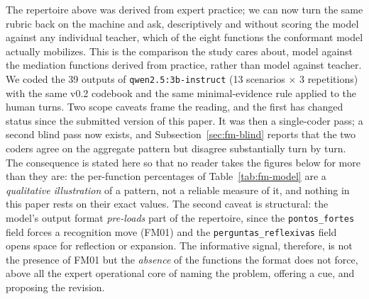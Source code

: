 \documentclass{sbc2023}%
\begin{document}
The repertoire above was derived from expert practice; we can now turn the same rubric back on the machine and ask, descriptively and without scoring the model against any individual teacher, which of the eight functions the conformant model actually mobilizes. This is the comparison the study cares about, model against the mediation functions derived from practice, rather than model against teacher. We coded the 39 outputs of \texttt{qwen2.5:3b-instruct} (13 scenarios $\times$ 3 repetitions) with the same v0.2 codebook and the same minimal-evidence rule applied to the human turns. Two scope caveats frame the reading, and the first has changed status since the submitted version of this paper. It was then a single-coder pass; a second blind pass now exists, and Subsection~\ref{sec:fm-blind} reports that the two coders agree on the aggregate pattern but disagree substantially turn by turn. The consequence is stated here so that no reader takes the figures below for more than they are: the per-function percentages of Table~\ref{tab:fm-model} are a \textit{qualitative illustration} of a pattern, not a reliable measure of it, and nothing in this paper rests on their exact values. The second caveat is structural: the model's output format \textit{pre-loads} part of the repertoire, since the \texttt{pontos\_fortes} field forces a recognition move (FM01) and the \texttt{perguntas\_reflexivas} field opens space for reflection or expansion. The informative signal, therefore, is not the presence of FM01 but the \textit{absence} of the functions the format does not force, above all the expert operational core of naming the problem, offering a cue, and proposing the revision.
\end{document}
